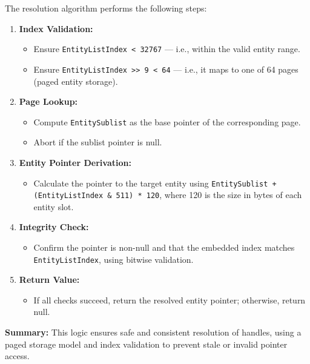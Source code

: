 \noindent The resolution algorithm performs the following steps:

\begin{enumerate}
    \item \textbf{Index Validation:}
    \begin{itemize}
        \item Ensure \texttt{EntityListIndex < 32767} — i.e., within the valid entity range.
        \item Ensure \texttt{EntityListIndex >> 9 < 64} — i.e., it maps to one of 64 pages (paged entity storage).
    \end{itemize}

    \item \textbf{Page Lookup:}
    \begin{itemize}
        \item Compute \texttt{EntitySublist} as the base pointer of the corresponding page.
        \item Abort if the sublist pointer is null.
    \end{itemize}

    \item \textbf{Entity Pointer Derivation:}
    \begin{itemize}
        \item Calculate the pointer to the target entity using \texttt{EntitySublist + (EntityListIndex \& 511) * 120}, where 120 is the size in bytes of each entity slot.
    \end{itemize}

    \item \textbf{Integrity Check:}
    \begin{itemize}
        \item Confirm the pointer is non-null and that the embedded index matches \texttt{EntityListIndex}, using bitwise validation.
    \end{itemize}

    \item \textbf{Return Value:}
    \begin{itemize}
        \item If all checks succeed, return the resolved entity pointer; otherwise, return null.
    \end{itemize}
\end{enumerate}

\vspace{0.5em}
\begin{tcolorbox}[colback=gray!05, colframe=black!15, sharp corners, boxrule=0pt]
\textbf{Summary:}  
This logic ensures safe and consistent resolution of handles, using a paged storage model and index validation to prevent stale or invalid pointer access.
\end{tcolorbox}
